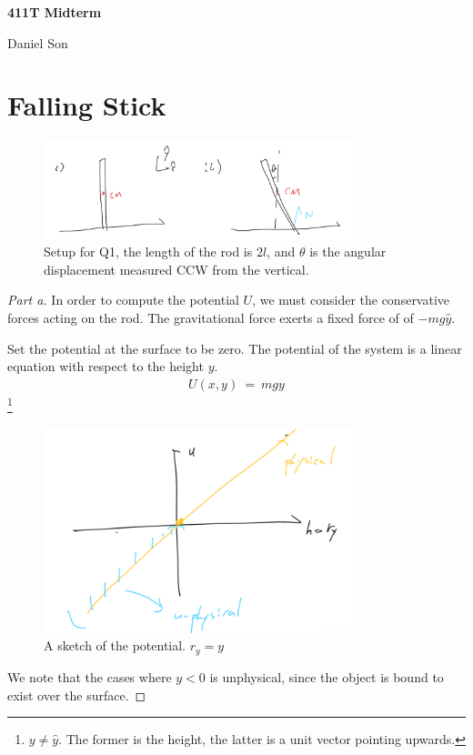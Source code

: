 \documentclass{article}
\numberwithin{equation}{section}
\begin{document}
\begin{center}
    \Large
    \textbf{411T Midterm}

    \large
    Daniel Son
\end{center}

\section{Falling Stick}
\begin{figure}[htp]
    \centering
    \includegraphics[width=0.8\textwidth]{Q1_figure.png} %
    \caption{Setup for Q1, the length of the rod is $2l$, and 
    $\theta$ is the angular displacement measured CCW from the vertical.}
    \label{fig:q1setup}
\end{figure}

\begin{proof}[Part a]
    In order to compute the potential $U$, we must consider the conservative forces 
    acting on the rod. The gravitational force exerts a fixed force of 
    of $-mg \hat y$. 

    Set the potential at the surface to be zero. The potential 
    of the system is a linear equation with respect to the height $y$. 
    \begin{align}
        U(x, y) \ = \ mg y
    \end{align}\footnote{$y \neq \hat y$. The former is the height, the 
    latter is a unit vector pointing upwards. }
    \begin{figure}[h]
        \centering
        \includegraphics[width=0.8\textwidth]{Q1_Potential.png} %
        \caption{A sketch of the potential. $r_y = y$}
        \label{fig:q1potential}
    \end{figure}
    We note that the cases where $y < 0$ is unphysical, since the object 
    is bound to exist over the surface. 
\end{proof}
\end{document}

